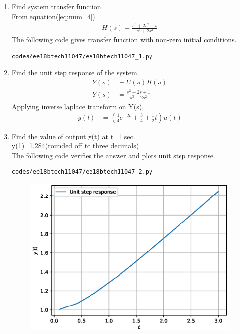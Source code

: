 \begin{enumerate}[label=\thesubsection.\arabic*.,ref=\thesubsection.\theenumi]
\item Find system transfer function.\\
\solution From equation(\ref{eq:num_4})
\begin{align}
{H}(s) = \frac{s^{3}+2s^{2}+s}{s^{3}+2s^{2}}
\end{align}
The following code gives transfer function with non-zero initial conditions.
\begin{lstlisting}
codes/ee18btech11047/ee18btech11047_1.py
\end{lstlisting}
\item Find the unit step response of the system.
\\
\solution
\begin{align}
{Y}(s) &= {U}(s){H}(s)
\\
{Y}(s)&=\frac{s^{2}+2s+1}{s^{3}+2s^{2}}
\end{align}
Applying inverse laplace transform on Y(s),
\begin{align}
y(t)&=(\frac{1}{4}e^{-2t}+\frac{3}{4}+\frac{1}{2}t)u(t)
\end{align}
\item Find the value of output y(t) at t=1 sec. \\
\solution
y(1)=1.284(rounded off to three decimals)\\
The following code verifies the answer and plots unit step response.
\begin{lstlisting}
codes/ee18btech11047/ee18btech11047_2.py
\end{lstlisting}
\begin{figure}[!ht]
\centering
  \includegraphics[width=\columnwidth]{./figs/ee18btech11047.eps}
  \caption{}
  \label{fig:ee18btech11047}
\end{figure}
\end{enumerate}
